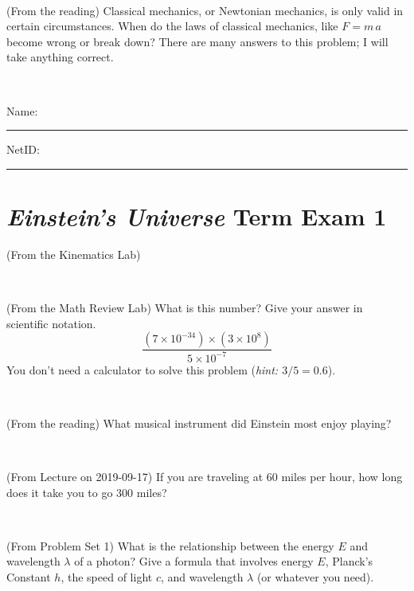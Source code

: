 \documentclass[12pt, letterpaper]{article}
\begin{document}
\vfill ~

\begin{problem} (From the reading)
Classical mechanics, or Newtonian mechanics, is only valid in certain
circumstances. When do the laws of classical mechanics, like $F =
m\,a$ become wrong or break down? There are many answers to this
problem; I will take anything correct.
\end{problem}


\vfill ~


\cleardoublepage



\noindent
Name: \rule[-1ex]{0.60\textwidth}{0.1pt}
NetID: \rule[-1ex]{0.20\textwidth}{0.1pt}

\section*{\textsl{Einstein's Universe} Term Exam 1}
\setcounter{problem}{1}


\begin{problem} (From the Kinematics Lab)

\end{problem}


\vfill ~

\begin{problem} (From the Math Review Lab)
What is this number? Give your answer in scientific notation.
$$
\frac{(7\times10^{-34})\times(3\times10^8)}{5\times10^{-7}}
$$
You don't need a calculator to solve this problem (\textit{hint: $3/5=0.6$}).
\end{problem}


\vfill ~

\begin{problem} (From the reading)
What musical instrument did Einstein most enjoy playing?
\end{problem}


\vfill ~

\begin{problem} (From Lecture on 2019-09-17)
If you are traveling at 60 miles per hour, how long does
it take you to go 300 miles?
\end{problem}


\vfill ~


\clearpage


\begin{problem} (From Problem Set 1)
What is the relationship between the energy $E$ and wavelength
$\lambda$ of a photon? Give a formula that involves energy $E$,
Planck's Constant $h$, the speed of light $c$, and wavelength
$\lambda$ (or whatever you need).
\end{problem}
\end{document}
